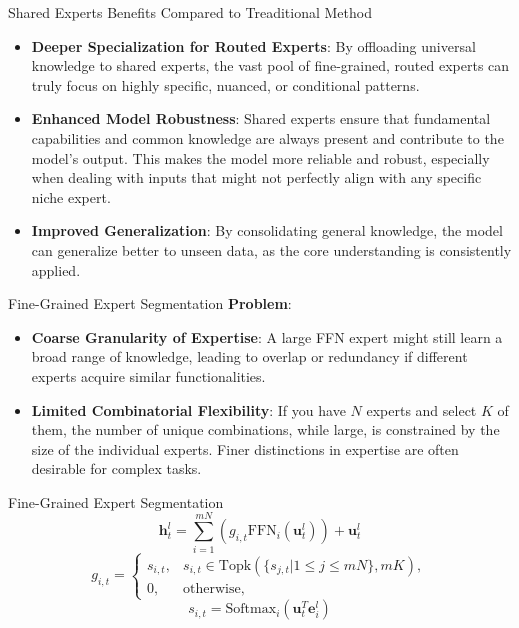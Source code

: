 \documentclass{beamer}
\begin{document}
\begin{frame}{Shared Experts Benefits Compared to Treaditional Method}
  \begin{itemize}
    \item \textbf{Deeper Specialization for Routed Experts}: By offloading universal knowledge to shared experts, the vast pool of fine-grained, 
    routed experts can truly focus on highly specific, nuanced, or conditional patterns.
    \item \textbf{Enhanced Model Robustness}: Shared experts ensure that fundamental capabilities 
    and common knowledge are always present and contribute to the model's output. This makes the model more reliable and robust, especially 
    when dealing with inputs that might not perfectly align with any specific niche expert.
    \item \textbf{Improved Generalization}: By consolidating general knowledge, the model can 
    generalize better to unseen data, as the core understanding is consistently applied.
    \cite{dai2024deepseekmoe}
  \end{itemize}
\end{frame}


\begin{frame}{Fine-Grained Expert Segmentation}
  \textbf{Problem}:  
  \begin{itemize}
    \item \textbf{Coarse Granularity of Expertise}: A large FFN expert might still learn a broad range of knowledge, 
    leading to overlap or redundancy if different experts acquire similar functionalities.
    \item \textbf{Limited Combinatorial Flexibility}: If you have $N$ experts and select $K$ of them, the number of unique combinations, 
    while large, is constrained by the size of the individual experts. 
    Finer distinctions in expertise are often desirable for complex tasks.
  \end{itemize}

  \cite{dai2024deepseekmoe}
\end{frame}

\begin{frame}{Fine-Grained Expert Segmentation}
  $$ \mathbf{h}^l_t = \sum_{i=1}^{mN} \left(g_{i,t} \text{FFN}_i (\mathbf{u}^l_t)\right) + \mathbf{u}^l_t $$
    $$ g_{i,t} = \begin{cases} s_{i,t}, & s_{i,t} \in \text{Topk}(\{s_{j,t}|1 \le j \le mN\}, mK), \\ 0, & \text{otherwise}, \end{cases} $$
    $$ s_{i,t} = \text{Softmax}_i \left(\mathbf{u}_t^T \mathbf{e}_i^l\right) $$
\end{frame}
\end{document}
